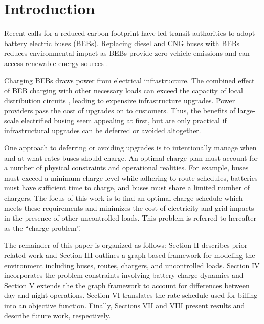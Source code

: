 \section{Introduction}
Recent calls for a reduced carbon footprint have led transit authorities to adopt battery electric buses (BEBs). Replacing diesel and CNG buses with BEBs reduces environmental impact \cite{zhou_optimization_2018} as BEBs provide zero vehicle emissions and can access renewable energy sources \cite{poornesh_comparative_2020, Mahmoud2016}.

\par Charging BEBs draws power from electrical infrastructure. The combined effect of BEB charging with other necessary loads can exceed the capacity of local distribution circuits \cite{stahleder_impact_2019, deb_impact_2017, boonraksa_impact_2019}, leading to expensive infrastructure upgrades. Power providers pass the cost of upgrades on to customers.  Thus, the benefits of large-scale electrified busing seem appealing at first, but are only practical if infrastructural upgrades can be deferred or avoided altogether.

\par One approach to deferring or avoiding upgrades is to intentionally manage when and at what rates buses should charge. An optimal charge plan must account for a number of physical constraints and operational realities. For example, buses must exceed a minimum charge level while adhering to route schedules, batteries must have sufficient time to charge, and buses must share a limited number of chargers. The focus of this work is to find an optimal charge schedule which meets these requirements and minimizes the cost of electricity and grid impacts in the presence of other uncontrolled loads. This problem is referred to hereafter as the ``charge problem''.

\par The remainder of this paper is organized as follows: Section II describes prior related work and Section III outlines a graph-based framework for modeling the environment including buses, routes, chargers, and uncontrolled loads. Section IV incorporates the problem constraints involving battery charge dynamics and Section V extends the the graph framework to account for differences between day and night operations.  Section VI translates the rate schedule used for billing into an objective function. Finally, Sections VII and VIII present results and describe future work, respectively.
